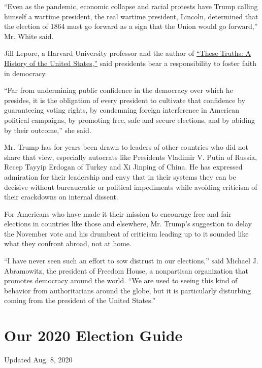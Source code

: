 ``Even as the pandemic, economic collapse and racial protests have Trump
calling himself a wartime president, the real wartime president,
Lincoln, determined that the election of 1864 must go forward as a sign
that the Union would go forward,'' Mr. White said.

Jill Lepore, a Harvard University professor and the author of
\href{https://www.nytimes.com/2018/09/14/books/review/jill-lepore-these-truths.html}{``These
Truths: A History of the United States,''} said presidents bear a
responsibility to foster faith in democracy.

``Far from undermining public confidence in the democracy over which he
presides, it is the obligation of every president to cultivate that
confidence by guaranteeing voting rights, by condemning foreign
interference in American political campaigns, by promoting free, safe
and secure elections, and by abiding by their outcome,'' she said.

Mr. Trump has for years been drawn to leaders of other countries who did
not share that view, especially autocrats like Presidents Vladimir V.
Putin of Russia, Recep Tayyip Erdogan of Turkey and Xi Jinping of China.
He has expressed admiration for their leadership and envy that in their
systems they can be decisive without bureaucratic or political
impediments while avoiding criticism of their crackdowns on internal
dissent.

For Americans who have made it their mission to encourage free and fair
elections in countries like those and elsewhere, Mr. Trump's suggestion
to delay the November vote and his drumbeat of criticism leading up to
it sounded like what they confront abroad, not at home.

``I have never seen such an effort to sow distrust in our elections,''
said Michael J. Abramowitz, the president of Freedom House, a
nonpartisan organization that promotes democracy around the world. ``We
are used to seeing this kind of behavior from authoritarians around the
globe, but it is particularly disturbing coming from the president of
the United States.''

\hypertarget{our-2020-election-guide}{%
\section{Our 2020 Election Guide}\label{our-2020-election-guide}}

Updated Aug. 8, 2020

